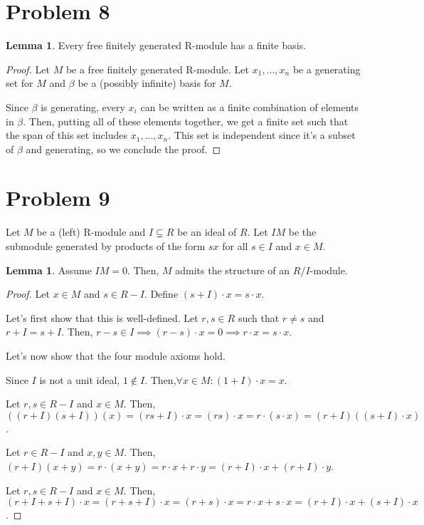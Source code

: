 \documentclass{article}
\theoremstyle{definition}
\newtheorem{lemma}[theorem]{Lemma}
\begin{document}
\section{Problem 8}

\begin{lemma}
    Every free finitely generated R-module has a finite basis.
\end{lemma}
\begin{proof}
    Let $M$ be a free finitely generated R-module.
    Let $x_{1},...,x_{n}$ be a generating set for $M$ and $\beta$ be a (possibly infinite) basis for $M$.

    Since $\beta$ is generating, every $x_{i}$ can be written as a finite combination of elements in $\beta$. Then, putting all of these elements together, we get a finite set such that the span of this set includes $x_{1},...,x_{n}$. This set is independent since it's a subset of $\beta$ and generating, so we conclude the proof.
\end{proof}
    

\section{Problem 9}

Let $M$ be a (left) R-module and $I \subsetneq R$ be an ideal of $R$. Let $IM$ be the submodule generated by products of the form $sx$ for all $s \in I$ and $x \in M$.

\begin{lemma}
    Assume $IM = 0$. Then, $M$ admits the structure of an $R/I$-module. 
\end{lemma}
\begin{proof}
    Let $x \in M$ and $s \in R - I$.
    Define $(s + I) \cdot x = s \cdot x$.

    Let's first show that this is well-defined. Let $r,s \in R$ such that $r \neq s$ and $r + I = s + I$. Then, $r - s \in I \implies (r-s) \cdot x = 0 \implies r \cdot x = s \cdot x$.

    Let's now show that the four module axioms hold.

    Since $I$ is not a unit ideal, $1 \notin I$. Then,$\forall x \in M: (1 + I) \cdot x = x$.

    Let $r,s \in R - I$ and $x \in M$. Then, $((r+I)(s+I))(x) = (rs + I) \cdot x = (rs) \cdot x = r \cdot (s \cdot x) = (r+I)((s+I) \cdot x)$.

    Let $r \in R - I$ and $x,y \in M$. Then, $(r + I)(x + y) = r \cdot (x+y) = r \cdot x + r \cdot y = (r+I) \cdot x + (r+I) \cdot y$.

    Let $r,s \in R - I$ and $x \in M$. Then, $(r + I + s + I) \cdot x = (r + s + I) \cdot x = (r + s) \cdot x = r \cdot x + s \cdot x = (r+I) \cdot x + (s+I) \cdot x$.
\end{proof}
\end{document}
